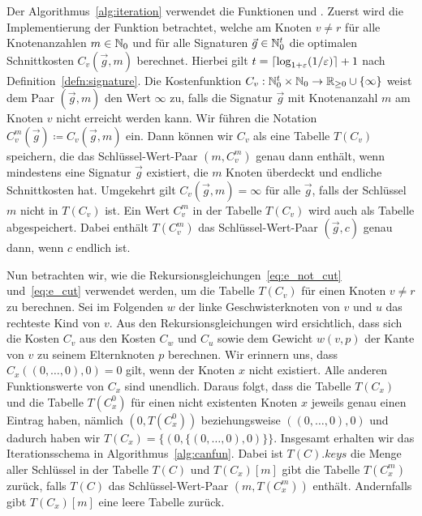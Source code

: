 Der Algorithmus~\ref{alg:iteration} verwendet die Funktionen \canfun{} und \carfun{}.
Zuerst wird die Implementierung der Funktion \canfun{} betrachtet, welche am Knoten $v \neq r$ für alle Knotenanzahlen $m \in \mathbb{N}_0$ und für alle Signaturen $\vec{g} \in \mathbb{N}_0^t$ die optimalen Schnittkosten $C_v(\vec{g}, m)$ berechnet.
Hierbei gilt $t = \lceil\log_{1+\varepsilon}(1/\varepsilon)\rceil + 1$ nach Definition~\ref{defn:signature}.
Die Kostenfunktion $C_v : \mathbb{N}_0^t \times \mathbb{N}_0 \rightarrow \mathbb{R}_{\geq 0} \cup \{\infty\}$ weist dem Paar $(\vec{g}, m)$ den Wert $\infty$ zu, falls die Signatur $\vec{g}$ mit Knotenanzahl $m$ am Knoten $v$ nicht erreicht werden kann.
Wir führen die Notation $C^m_v(\vec{g}) \coloneqq C_v(\vec{g}, m)$ ein.
Dann können wir $C_v$ als eine Tabelle $T(C_v)$ speichern, die das Schlüssel-Wert-Paar $(m,C^m_v)$ genau dann enthält, wenn mindestens eine Signatur $\vec{g}$ existiert, die $m$ Knoten überdeckt und endliche Schnittkosten hat.
Umgekehrt gilt $C_v(\vec{g}, m) = \infty$ für alle $\vec{g}$, falls der Schlüssel $m$ nicht in $T(C_v)$ ist.
Ein Wert $C_v^m$ in der Tabelle $T(C_v)$ wird auch als Tabelle abgespeichert.
Dabei enthält $T(C_v^m)$ das Schlüssel-Wert-Paar $(\vec{g}, c)$ genau dann, wenn $c$ endlich ist.

Nun betrachten wir, wie die Rekursionsgleichungen~\eqref{eq:e_not_cut} und~\eqref{eq:e_cut} verwendet werden, um die Tabelle $T(C_v)$ für einen Knoten $v \neq r$ zu berechnen.
Sei im Folgenden $w$ der linke Geschwisterknoten von $v$ und $u$ das rechteste Kind von $v$.
Aus den Rekursionsgleichungen wird ersichtlich, dass sich die Kosten $C_v$ aus den Kosten $C_w$ und $C_u$ sowie dem Gewicht $w(v, p)$ der Kante von $v$ zu seinem Elternknoten $p$ berechnen.
Wir erinnern uns, dass $C_x((0,\ldots, 0),0) = 0$ gilt, wenn der Knoten $x$ nicht existiert. 
Alle anderen Funktionswerte von $C_x$ sind unendlich.
Daraus folgt, dass die Tabelle $T(C_x)$ und die Tabelle $T(C^0_x)$ für einen nicht existenten Knoten $x$ jeweils genau einen Eintrag haben, nämlich $(0, T(C^0_x))$ beziehungsweise $((0,\ldots,0), 0)$ und dadurch haben wir $T(C_x) = \{(0, \{(0, \ldots, 0), 0)\}\}$.
Insgesamt erhalten wir das Iterationsschema in Algorithmus~\ref{alg:canfun}.
Dabei ist $T(C).keys$ die Menge aller Schlüssel in der Tabelle $T(C)$ und $T(C_x)[m]$ gibt die Tabelle $T(C^m_x)$ zurück, falls $T(C)$ das Schlüssel-Wert-Paar $(m, T(C^m_x))$ enthält.
Andernfalls gibt $T(C_x)[m]$ eine leere Tabelle zurück.

